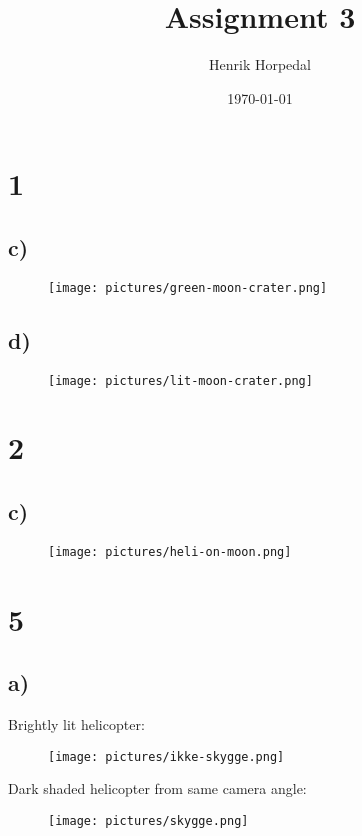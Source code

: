 \documentclass{article}
\title{Assignment 3}
\author{Henrik Horpedal}
\date{\today}
\begin{document}
\maketitle

\newpage 

\section{1}
\subsection{c)}
\begin{figure}[h]
    \centering
    \texttt{[image: pictures/green-moon-crater.png]}
\end{figure}

\subsection{d)}
\begin{figure}[h]
    \centering
    \texttt{[image: pictures/lit-moon-crater.png]}
\end{figure}
\FloatBarrier

\section{2}
\subsection{c)}
\begin{figure}[h]
    \centering
    \texttt{[image: pictures/heli-on-moon.png]}
\end{figure}

\FloatBarrier

\section{5}
\subsection{a)}
Brightly lit helicopter:
\begin{figure}[h]
    \centering
    \texttt{[image: pictures/ikke-skygge.png]}
\end{figure}
\FloatBarrier
Dark shaded helicopter from same camera angle:
\begin{figure}[h]
    \centering
    \texttt{[image: pictures/skygge.png]}
\end{figure}
\FloatBarrier
\end{document}
